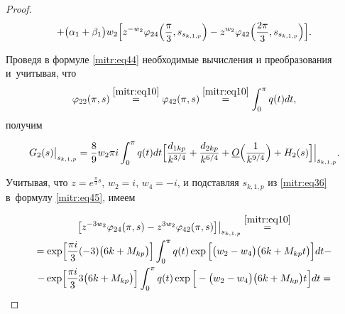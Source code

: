 \begin{proof}
\begin{multline}
+

\big(\alpha_1+\beta_1\big)

w_2\Bigl[z^{-w_2}\varphi_{24}\Bigl(\frac{\pi}3,s_{s_{k,1,p}}\Bigr)- z^{w_2}

\varphi_{42}\Bigl(\frac{2\pi}3,s_{s_{k,1,p}}\Bigr)\Bigr].

\end{multline}

Проведя в формуле \eqref{mitr:eq44} необходимые вычисления и преобразования и~учитывая, что  $$\varphi_{22}(\pi,s)\stackrel{\eqref{mitr:eq10}}{=} \varphi_{42}(\pi,s)\stackrel{\eqref{mitr:eq10}}{=}\int^\pi_0 q(t) dt,$$ получим

\begin{equation}

\label{mitr:eq46}

G_2(s)\big|_{s_{k,1,p}}=\frac89 w_2 \pi i\int^\pi_0 q(t)dt

\Bigl[\frac{d_{1kp}}{k^{3/4}}+\frac{d_{2kp}}{k^{6/4}}+\underline O

\Bigl(\frac1{k^{9/4}}\Bigr)+H_2(s)\Bigr]\Big|_{s_{k,1,p}}.

\end{equation}



Учитывая, что $z=e^{\frac \pi 3 s}$, $w_2=i$, $w_4=-i$, и подставляя $s_{k,1,p}$ из \eqref{mitr:eq36} в~формулу \eqref{mitr:eq45}, имеем


\begin{multline}

\label{mitr:eq47}

\big[z^{-3w_2}\varphi_{24}(\pi,s)- z^{3w_2}

\varphi_{42}(\pi,s)\big]\big |_{s_{k,1,p}}

\stackrel{\eqref{mitr:eq10}}{=}  \\ 

=

\exp\Bigl[\frac{\pi i}3 (-3)\big({6k}+M_{kp}\big)\Bigr]

\int ^\pi_0 q(t)\exp

\Big[\big(w_2-w_4\big)\big({6k}+M_{kp}t\big)\Big]dt-\\-

\exp\Bigl[\frac{\pi i}3 3\big({6k}+M_{kp}\big)\Bigr]

\int ^\pi_0 q(t)\exp

\Big[-\big(w_2-w_4\big)\big({6k}+M_{kp}\big)t\Big]dt=\\ 


\end{multline}
\end{proof}
